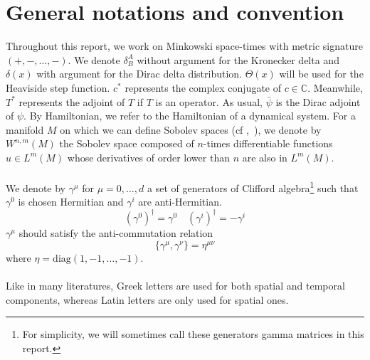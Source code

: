 \section*{General notations and convention}
Throughout this report, we work on Minkowski space-times with metric signature $(+, -,\ldots, -)$.
We denote $\delta^A_B$ without argument for the Kronecker delta and $\delta(x)$ with argument for the Dirac delta distribution.
$\Theta(x)$ will be used for the Heaviside step function.
$c^*$ represents the complex conjugate of $c\in\mathbb{C}$. 
Meanwhile, $T^*$ represents the adjoint of $T$ if $T$ is an operator.
As usual, $\bar{\psi}$ is the Dirac adjoint of $\psi$.
By Hamiltonian, we refer to the Hamiltonian of a dynamical system.
For a manifold $M$ on which we can define Sobolev spaces (cf \eg\cite{Hebey1996},~\cite{Eichhorn1996}), 
we denote by $W^{n,m}(M)$ the Sobolev space composed of $n$-times differentiable functions $u\in L^m(M)$ whose derivatives of order lower than $n$ are also in $L^m(M)$.
\\\\
We denote by $\gamma^\mu$ for $\mu = 0, \ldots, d$ a set of generators of Clifford algebra\footnote{
For simplicity, we will sometimes call these generators gamma matrices in this report.
}
such that $\gamma^0$ is chosen Hermitian and $\gamma^i$ are anti-Hermitian.
\ie
\begin{equation*}
(\gamma^0)^\dagger = \gamma^0 \quad
(\gamma^i)^\dagger = -\gamma^i
\end{equation*}
$\gamma^\mu$ should satisfy the anti-commutation relation
\begin{equation*}
\{ \gamma^\mu, \gamma^\nu \} = \eta^{\mu\nu}
\end{equation*} 
where $\eta = \mathrm{diag}(1, -1 ,\ldots, -1)$. \\\\
Like in many literatures, Greek letters are used for both spatial and temporal components, whereas Latin letters are only used for spatial ones. \\